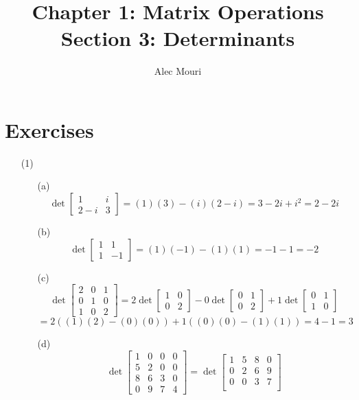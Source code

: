 \documentclass[12pt]{article}
\begin{document}
\title{Chapter 1: Matrix Operations \\ Section 3: Determinants}
\author{Alec Mouri}

\maketitle
\section*{Exercises}
\begin{itemize}
\item[(1)]
\begin{itemize}
\item[(a)]
$$\det\begin{bmatrix}
1 & i \\
2 - i & 3
\end{bmatrix} = (1)(3) - (i)(2 - i) = 3 - 2i + i^2 = 2 - 2i$$
\item[(b)]
$$\det\begin{bmatrix}
1 & 1 \\
1 & -1
\end{bmatrix} = (1)(-1) - (1)(1) = -1 - 1 = -2$$
\item[(c)]
$$\det\begin{bmatrix}
2 & 0 & 1 \\
0 & 1 & 0 \\
1 & 0 & 2
\end{bmatrix} = 2\det\begin{bmatrix}
1 & 0 \\
0 & 2
\end{bmatrix} - 0\det\begin{bmatrix}
0 & 1 \\
0 & 2
\end{bmatrix} + 1\det\begin{bmatrix}
0 & 1 \\
1 & 0
\end{bmatrix}$$
$$= 2((1)(2) - (0)(0)) + 1((0)(0) - (1)(1)) = 4 - 1 = 3$$
\item[(d)]
$$\det\begin{bmatrix}
1 & 0 & 0 & 0 \\
5 & 2 & 0 & 0 \\
8 & 6 & 3 & 0 \\
0 & 9 & 7 & 4
\end{bmatrix} = \det\begin{bmatrix}
1 & 5 & 8 & 0 \\
0 & 2 & 6 & 9 \\
0 & 0 & 3 & 7 \\

\end{bmatrix}$$
\end{itemize}
\end{itemize}
\end{document}
